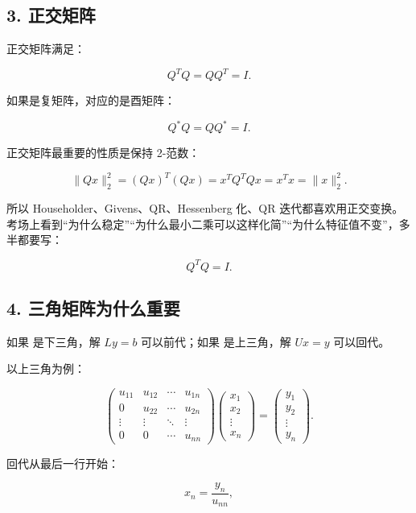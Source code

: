\documentclass[11pt,a4paper]{ctexart}
\newcommand{\code}[1]{\begingroup\ttfamily\small #1\endgroup}
\begin{document}

\subsection*{3. 正交矩阵}


正交矩阵满足：

\[
Q^TQ=QQ^T=I.
\]

如果是复矩阵，对应的是酉矩阵：

\[
Q^*Q=QQ^*=I.
\]

正交矩阵最重要的性质是保持 2-范数：

\[
\|Qx\|_2^2=(Qx)^T(Qx)=x^TQ^TQx=x^Tx=\|x\|_2^2.
\]

所以 Householder、Givens、QR、Hessenberg 化、QR 迭代都喜欢用正交变换。考场上看到“为什么稳定”“为什么最小二乘可以这样化简”“为什么特征值不变”，多半都要写：

\[
Q^TQ=I.
\]


\subsection*{4. 三角矩阵为什么重要}


如果 \code{} 是下三角，解 $Ly=b$ 可以前代；如果 \code{} 是上三角，解 $Ux=y$ 可以回代。

以上三角为例：

\[
\begin{pmatrix}
u_{11}&u_{12}&\cdots&u_{1n}\\
0&u_{22}&\cdots&u_{2n}\\
\vdots&\vdots&\ddots&\vdots\\
0&0&\cdots&u_{nn}
\end{pmatrix}
\begin{pmatrix}x_1\\x_2\\\vdots\\x_n\end{pmatrix}
=
\begin{pmatrix}y_1\\y_2\\\vdots\\y_n\end{pmatrix}.
\]

回代从最后一行开始：

\[
x_n=\frac{y_n}{u_{nn}},
\]
\end{document}
